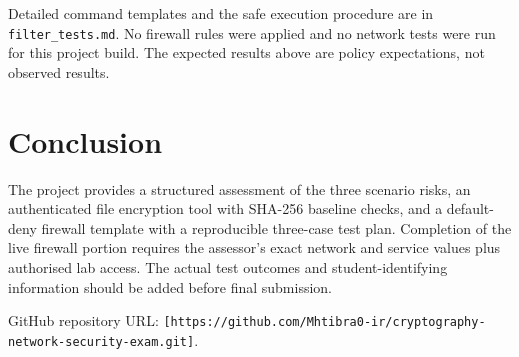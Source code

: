 \documentclass[11pt,a4paper]{article}
\begin{document}
Detailed command templates and the safe execution procedure are in \texttt{filter\_tests.md}. No firewall rules were applied and no network tests were run for this project build. The expected results above are policy expectations, not observed results.

\section{Conclusion}
The project provides a structured assessment of the three scenario risks, an authenticated file encryption tool with SHA-256 baseline checks, and a default-deny firewall template with a reproducible three-case test plan. Completion of the live firewall portion requires the assessor's exact network and service values plus authorised lab access. The actual test outcomes and student-identifying information should be added before final submission.

GitHub repository URL: \texttt{[https://github.com/Mhtibra0-ir/cryptography-network-security-exam.git]}.
\end{document}
